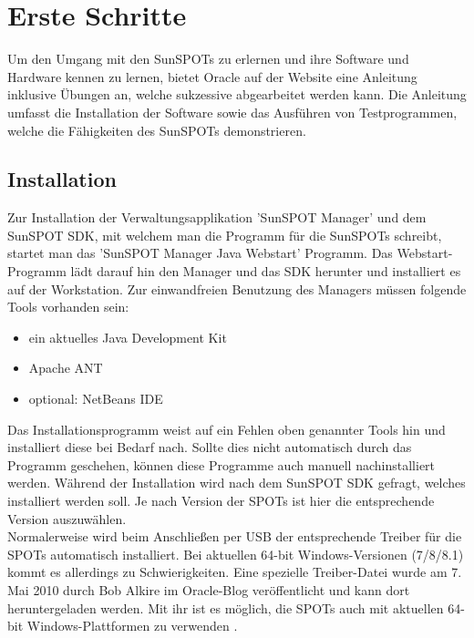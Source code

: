 \section{Erste Schritte}\label{s:ErsteSchritte}

Um den Umgang mit den SunSPOTs zu erlernen und ihre Software und Hardware kennen zu lernen, bietet Oracle auf der Website eine Anleitung inklusive Übungen an, welche sukzessive abgearbeitet werden kann. Die Anleitung umfasst die Installation der Software sowie das Ausführen von Testprogrammen, welche die Fähigkeiten des SunSPOTs demonstrieren.

\subsection{Installation}\label{s:Installation}

Zur Installation der Verwaltungsapplikation 'SunSPOT Manager' und dem Sun\-SPOT SDK, mit welchem man die Programm für die SunSPOTs schreibt, startet man das 'SunSPOT Manager Java Webstart' Programm. Das Webstart-Programm lädt darauf hin den Manager und das SDK herunter und installiert es auf der Workstation. Zur einwandfreien Benutzung des Managers müssen folgende Tools vorhanden sein:

\begin{itemize}
	\item ein aktuelles Java Development Kit
	\item Apache ANT
	\item optional: NetBeans IDE
\end{itemize}

Das Installationsprogramm weist auf ein Fehlen oben genannter Tools hin und installiert diese bei Bedarf nach. Sollte dies nicht automatisch durch das Programm geschehen, können diese Programme auch manuell nachinstalliert werden.
Während der Installation wird nach dem SunSPOT SDK gefragt, welches installiert werden soll. Je nach Version der SPOTs ist hier die entsprechende Version auszuwählen.\\

Normalerweise wird beim Anschließen per USB der entsprechende Treiber für die SPOTs automatisch installiert. Bei aktuellen 64-bit Windows-Versionen (7/8/8.1) kommt es allerdings zu Schwierigkeiten. Eine spezielle Treiber-Datei wurde am 7. Mai 2010 durch Bob Alkire im Oracle-Blog veröffentlicht und kann dort heruntergeladen werden. Mit ihr ist es möglich, die SPOTs auch mit aktuellen 64-bit Windows-Plattformen zu verwenden \cite{ws:alkire}.\\

